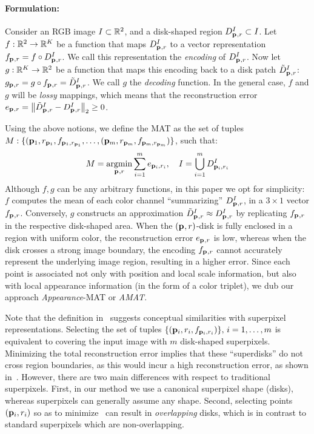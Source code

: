 \documentclass[10pt,twocolumn,letterpaper]{article}
\begin{document}
\paragraph{Formulation:} Consider an RGB image $I\subset\mathbb{R}^2$, and a disk-shaped region $D_{\mathbf{p}_{},r}^I \subset I$.
Let $f:\mathbb{R}^2 \rightarrow \mathbb{R}^K$ be a function that maps $D_{\mathbf{p}_{},r}^I$ to a vector representation $f_{\mathbf{p}_{},r}=f\circ D_{\mathbf{p}_{},r}^I$. 
We call this representation the \emph{encoding} of $D_{\mathbf{p}_{},r}^I$. 
Now let $g:\mathbb{R}^K \rightarrow \mathbb{R}^2$ be a function that maps this encoding back to a disk patch $\tilde{D}_{\mathbf{p}_{},r}^I$: 
$g_{\mathbf{p}_{},r} = g \circ f_{\mathbf{p}_{},r} = \tilde{D}_{\mathbf{p}_{},r}^I$. We call $g$ the \emph{decoding} function.
In the general case, $f$ and $g$ will be \emph{lossy} mappings, which means that the reconstruction error 
$e_{\mathbf{p}_{},r} = \left \lVert  \tilde{D}_{\mathbf{p}_{},r}^I - D_{\mathbf{p}_{},r}^I \right \rVert_2 \geq 0$. 

Using the above notions, we define the MAT as the set of tuples 
$M:\{ ( \mathbf{p}_{1},r_{\mathbf{p}_{1}}, f_{\mathbf{p}_{1},r_{\mathbf{p}_{1}}}, \ldots, ( \mathbf{p}_{m},r_{\mathbf{p}_{m}}, f_{\mathbf{p}_{m},r_{\mathbf{p}_{m}}} ) \}$, such that:
\begin{equation}
M = \operatorname*{argmin}_{\mathbf{p}_{},r}{\sum_{i=1}^m e_{\mathbf{p}_{i},r_i}},\quad I=\bigcup_{i=1}^m D_{\mathbf{p}_{i},r_i}^I 
\label{eq:minimization}
\end{equation}
Although $f,g$ can be any arbitrary functions, in this paper we opt for simplicity:
$f$ computes the mean of each color channel ``summarizing'' $D_{\mathbf{p}_{},r}^I$, in a $3\times1$ vector $f_{\mathbf{p}_{},r}$.
Conversely, $g$ constructs an approximation $\tilde{D}_{\mathbf{p}_{},r}^I \approx D_{\mathbf{p}_{},r}^I$ by replicating $f_{\mathbf{p}_{},r}$ in the
respective disk-shaped area.
When the $(\mathbf{p}_{},r)$-disk is fully enclosed in a region with uniform color, the reconstruction error $e_{\mathbf{p}_{},r}$
is low, whereas when the disk crosses a strong image boundary, the encoding $f_{\mathbf{p}_{},r}$ cannot accurately represent
the underlying image region, resulting in a higher error. Since each point is associated not only with position and local
scale information, but also with local appearance information (in the form of a color triplet), we dub our approach
\emph{Appearance}-MAT or \emph{AMAT}. 

Note that the definition in~ suggests conceptual similarities with superpixel representations.
Selecting the set of tuples $\{(\mathbf{p}_{i},r_i,f_{\mathbf{p}_{i},r_i})\},\,i=1,\ldots,m$ is equivalent to covering the input image
with $m$ disk-shaped superpixels. Minimizing the total reconstruction error implies that these ``superdisks'' do not
cross region boundaries, as this would incur a high reconstruction error, as shown in~.
However, there are two main differences with respect to traditional superpixels.
First, in our method we use a canonical
superpixel shape (disks), whereas superpixels can generally assume any shape. Second, selecting points $(\mathbf{p}_{i},r_i)$
so as to minimize~ can result in \emph{overlapping} disks, which is in contrast to standard superpixels
which are non-overlapping. 
\end{document}

